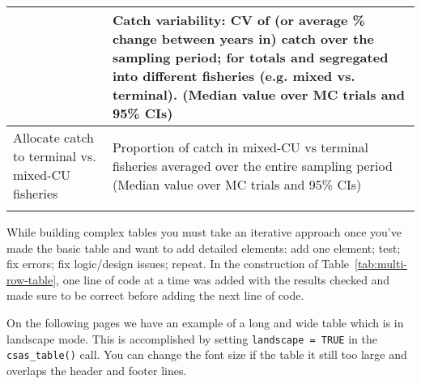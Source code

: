 \documentclass[12pt]{article}\usepackage[]{graphicx}\usepackage[]{color}
\begin{document}
\begin{longtable}[t]{>{\raggedright\arraybackslash}p{15em}>{\raggedright\arraybackslash}p{30em}}
\cmidrule(l){2-2}  & Catch variability: CV of (or average \% change between years in) catch over the sampling period; for totals and segregated into different fisheries (e.g. mixed vs. terminal). (Median value over MC trials and 95\% CIs)\\
\midrule Allocate catch to terminal vs. mixed-CU fisheries & Proportion of catch in mixed-CU vs terminal fisheries averaged over the entire sampling period (Median value over MC trials and 95\% CIs)\\* \end{longtable}

\endgroup{} \endgroup{}

While building complex tables you must take an iterative approach once you've made the basic table and want to add detailed elements: add one element; test; fix errors; fix logic/design issues; repeat. In the construction of Table~\ref{tab:multi-row-table}, one line of code at a time was added with the results checked and made sure to be correct before adding the next line of code.

On the following pages we have an example of a long and wide table which is in landscape mode. This is accomplished by setting \texttt{landscape\ =\ TRUE} in the \texttt{csas\_table()} call. You can change the font size if the table it still too large and overlaps the header and footer lines.
\end{document}
